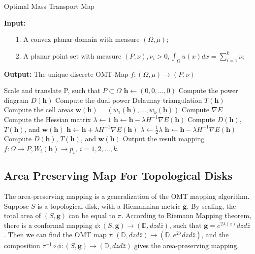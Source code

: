 \documentclass[runningheads]{llncs}
\begin{document}
\begin{algorithm}
\caption{Optimal Mass Transport Map}
\begin{algorithmic}[1]
	\REQUIRE \textbf{Input:}
	\begin{enumerate}
	\item[1.] A convex planar domain with measure $(\Omega,\mu)$;
	\item[2.] A planar point set with measure $(P,\nu),\nu_i>0,\int_\Omega u(x)dx=\sum^k_{i=1}\nu_i$
	\end{enumerate}
	\textbf{Output:} The unique discrete OMT-Map $f:(\Omega,\mu)\rightarrow(P,\nu)$
	
  	\STATE Scale and translate P, such that $P\subset \Omega$
  	\STATE $\mathbf{h}\leftarrow(0,0,...,0)$
  	\STATE Compute the power diagram $D(\mathbf{h})$
  	\STATE Compute the dual power Delaunay triangulation $T(\mathbf{h})$
  	\STATE Compute the cell areas $\mathbf{w}(\mathbf{h})=(w_1(\mathbf{h}),...,w_k(\mathbf{h}))$
  	\STATE Compute $\nabla E$
  	\STATE Compute the Hessian matrix
  	\STATE $\lambda\leftarrow 1$
  	\STATE $\mathbf{h}\leftarrow \mathbf{h}-\lambda H^{-1}\nabla E(\mathbf{h})$
  	\STATE Compute $D(\mathbf{h})$, $T(\mathbf{h})$, and $\mathbf{w}(\mathbf{h})$
  		\STATE $\mathbf{h}\leftarrow \mathbf{h}+\lambda H^{-1}\nabla E(\mathbf{h})$
  		\STATE $\lambda\leftarrow\frac{1}{2}\lambda$
  		\STATE $\mathbf{h}\leftarrow \mathbf{h}-\lambda H^{-1}\nabla E(\mathbf{h})$
  		\STATE Compute $D(\mathbf{h})$, $T(\mathbf{h})$, and $\mathbf{w}(\mathbf{h})$
  		\ENDWHILE
  	\ENDWHILE
  	\STATE Output the result mapping $f:\Omega\rightarrow P, W_i(\mathbf{h})\rightarrow p_i,\ i=1,2,...,k.$
\end{algorithmic}
\label{Algo:OMT}
\end{algorithm}




\subsection{Area Preserving Map For Topological Disks}

The area-preserving mapping is a generalization of the OMT mapping algorithm. Suppose $S$ is a topological disk, with a Riemannian metric $\mathbf{g}$. By scaling, the total area of $(S,\mathbf{g})$ can be equal to $\pi$. According to Riemann Mapping theorem, there is a conformal mapping $\phi :(S,\mathbf{g})\rightarrow(\mathbb{D},dzd\bar{z})$, such that $\mathbf{g}= e^{2\lambda(z)}dzd\bar{z}$. Then we can find the OMT map $\tau:(\mathbb{D},dzd\bar{z})\rightarrow (\mathbb{D},e^{2\lambda}dzd\bar{z})$, and the composition $\tau^{-1}\circ \phi:(S,\mathbf{g})\rightarrow(\mathbb{D},dzd\bar{z})$ gives the area-preserving mapping.
\end{document}
